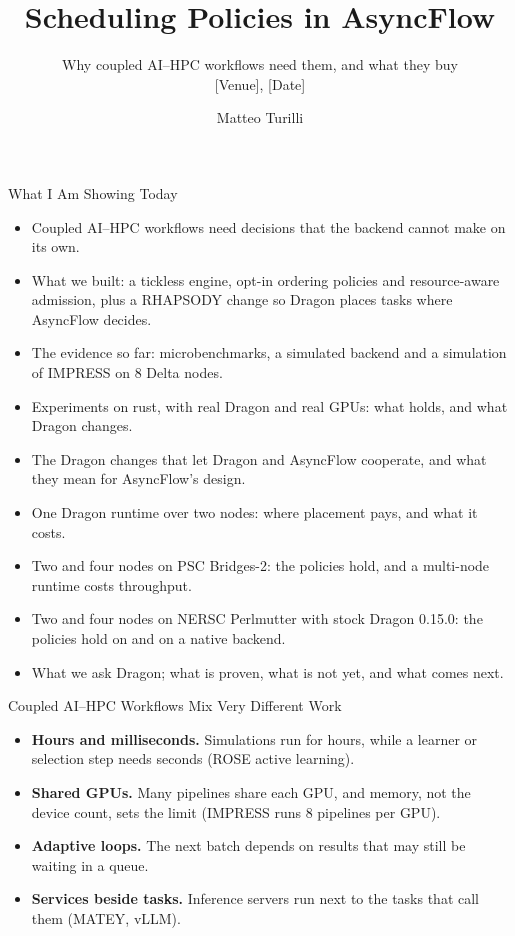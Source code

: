 \documentclass[aspectratio=169, 10pt, t]{beamer}
\title{Scheduling Policies in AsyncFlow}
\subtitle{Why coupled AI--HPC workflows need them, and what they buy\\{}[Venue], [Date]}
\author{Matteo Turilli}
\date{}
\begin{document}
\begin{frame}[plain]
  \titlepage
\end{frame}

\begin{frame}{What I Am Showing Today}
\begin{itemize}
  \item Coupled AI--HPC workflows need decisions that the backend cannot make on its own.
  \item What we built: a tickless engine, opt-in ordering policies and resource-aware admission, plus a RHAPSODY change so Dragon places tasks where AsyncFlow decides.
  \item The evidence so far: microbenchmarks, a simulated backend and a simulation of IMPRESS on 8 Delta nodes.
  \item Experiments on rust, with real Dragon and real GPUs: what holds, and what Dragon changes.
  \item The Dragon changes that let Dragon and AsyncFlow cooperate, and what they mean for AsyncFlow's design.
  \item One Dragon runtime over two nodes: where placement pays, and what it costs.
  \item Two and four nodes on PSC Bridges-2: the policies hold, and a multi-node runtime costs throughput.
  \item Two and four nodes on NERSC Perlmutter with stock Dragon 0.15.0: the policies hold on  and on a native backend.
  \item What we ask Dragon; what is proven, what is not yet, and what comes next.
\end{itemize}
\end{frame}


\begin{frame}{Coupled AI--HPC Workflows Mix Very Different Work}
\begin{itemize}
  \item \textbf{Hours and milliseconds.} Simulations run for hours, while a learner or selection step needs seconds (ROSE active learning).
  \item \textbf{Shared GPUs.} Many pipelines share each GPU, and memory, not the device count, sets the limit (IMPRESS runs 8 pipelines per GPU).
  \item \textbf{Adaptive loops.} The next batch depends on results that may still be waiting in a queue.
  \item \textbf{Services beside tasks.} Inference servers run next to the tasks that call them (MATEY, vLLM).
\end{itemize}
\vfill
\begin{center}
\end{center}
\vfill
\end{frame}
\end{document}
